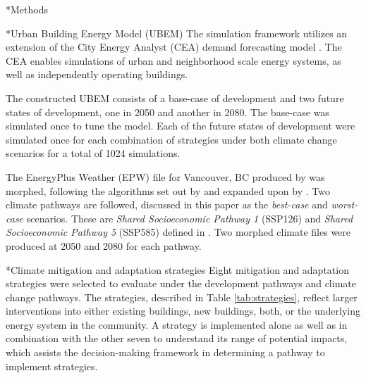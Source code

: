 \documentclass[twocolumn, a4paper,10pt]{article}
\makeatletter
\renewcommand\section{\@startsection{section}{1}{\z@}{3pt}{3pt}{\normalfont\large\bfseries}}
\renewcommand\subsection{\@startsection{subsection}{1}{\z@}{\z@}{\z@}{\normalfont\normalsize\bfseries}}
\renewcommand\subsection{\@startsection{subsection}{1}{\z@}{\z@}{0.1pt}{\normalfont\normalsize\bfseries}}
\makeatother
\begin{document}
\section*{Methods}



\subsection*{Urban Building Energy Model (UBEM)}
The simulation framework utilizes an extension of the City Energy Analyst (CEA) demand forecasting model \citep{fonseca_city_2016,the_cea_team_city_2020}. The CEA enables simulations of urban and neighborhood scale energy systems, as well as independently operating buildings. 

The constructed UBEM consists of a base-case of development and two future states of development, one in 2050 and another in 2080. The base-case was simulated once to tune the model. Each of the future states of development were simulated once for each combination of strategies under both climate change scenarios for a total of 1024 simulations.  

The EnergyPlus Weather (EPW) file for Vancouver, BC produced by \citet{cwec_2016} was morphed, following the algorithms set out by \citet{belcher_constructing_2005} and expanded upon by \citet{jentsch_climate_2008}. Two climate pathways are followed, discussed in this paper as the \textit{best-case} and \textit{worst-case} scenarios. These are \textit{Shared Socioeconomic Pathway 1} (SSP126) and \textit{Shared Socioeconomic Pathway 5} (SSP585)
defined in \citet{oneill_roads_2017}. Two morphed climate files were produced at 2050 and 2080 for each pathway.




\subsection*{Climate mitigation and adaptation strategies}
Eight mitigation and adaptation strategies were selected to evaluate under the development pathways and climate change pathways. The strategies, described in Table \ref{tab:strategies}, reflect larger interventions into either existing buildings, new buildings, both, or the underlying energy system in the community. A strategy is implemented alone as well as in combination with the other seven to understand its range of potential impacts, which assists the decision-making framework in determining a pathway to implement strategies.
\end{document}
